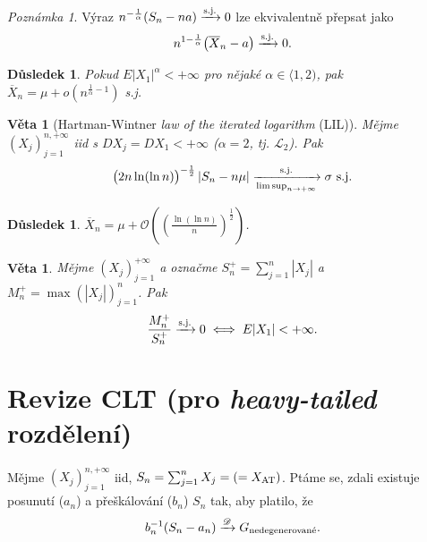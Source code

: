 \documentclass{article}
\newtheorem{theorem}[subsubsection]{Věta}
\theoremstyle{remark}
\newtheorem*{remark}{Poznámka}
\theoremstyle{plain}
\newtheorem{dusl}[subsubsection]{Důsledek}
\theoremstyle{definition}
\theoremstyle{remark}
\begin{document}
\begin{remark}
Výraz $n^{-\frac{1}{\alpha}}(S_n-na)\xrightarrow{\textnormal{s.j.}} 0$ lze ekvivalentně přepsat jako
\begin{align*}
    n^{1-\frac{1}{\alpha}}\big(\overline{X}_n-a\big)\xrightarrow{\textnormal{s.j.}} 0.
\end{align*}
\end{remark}

\begin{dusl}
Pokud $E|X_1|^\alpha<+\infty$ pro nějaké $\alpha\in\langle 1,2)$, pak $\overline{X}_n=\mu+o(n^{\frac{1}{\alpha}-1})$ s.j.
\end{dusl}

\begin{theorem}[Hartman-Wintner \textit{law of the iterated logarithm} (LIL)]
Mějme $(X_j)_{j=1}^{n,+\infty}$ iid s $DX_j=DX_1<+\infty$ ($\alpha=2$, tj. $\mathscr{L}_2$). Pak
\begin{align*}
    \big(2n\ln(\ln n)\big)^{-\frac{1}{2}}\left|S_n-n\mu\right|\xrightarrow[\limsup_{n\rightarrow +\infty}]{\textnormal{s.j.}}\sigma\,\,\textnormal{s.j.}
\end{align*}
\end{theorem}

\begin{dusl}
$\overline{X}_n=\mu+\mathcal{O}\left(\left(\frac{\ln(\ln n)}{n}\right)^{\frac{1}{2}}\right)$.
\end{dusl}

\begin{theorem}
Mějme $(X_j)_{j=1}^{+\infty}$ a označme $S_n^{+}=\sum_{j=1}^n|X_j|$ a $M_n^{+}=\max\left(|X_j|\right)_{j=1}^n$. Pak 
\begin{align*}
    \frac{M_n^{+}}{S_n^{+}}\xrightarrow{\textnormal{s.j.}} 0 \iff E|X_1|<+\infty.
\end{align*}
\end{theorem}

\section{Revize CLT (pro \textit{heavy-tailed} rozdělení)}

Mějme $(X_j)_{j=1}^{n,+\infty}$ iid, $S_n=\sum_{j=1}^n X_j=\left(=X_{\textnormal{AT}}\right)$. Ptáme se, zdali existuje posunutí ($a_n$) a přeškálování ($b_n$) $S_n$ tak, aby platilo, že 
\begin{align*}
    b_n^{-1}(S_n-a_n)\xrightarrow{\mathscr{D}} G_{\textnormal{nedegenerované}}.
\end{align*}
\end{document}

